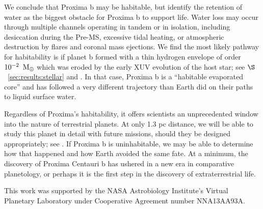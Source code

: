\documentclass[preprint,12pt]{aastex}
\newcommand{\xxx}[1]{{\color{red} #1}} %
\newcommand{\xxx}[1]{{\color{red} #1}} %
\def\mearth{{\rm\,M_\oplus}}
\begin{document}
We conclude that Proxima b may be habitable, but identify the
retention of water as the biggest obstacle for Proxima b to support
life. Water loss may occur through multiple channels operating in
tandem or in isolation, including desiccation during the Pre-MS,
excessive tidal heating, or atmospheric destruction by flares and
coronal mass ejections. We find the most likely pathway for
habitability is if planet b formed with a thin hydrogen envelope of
order $10^{-2}~\mearth$ which was eroded by the early XUV evolution of
the host star; see $\S$~\ref{sec:results:stellar} and \cite{Luger15}. In
that case, Proxima b is a ``habitable evaporated core'' and has
followed a very different trajectory than Earth did on their paths to
liquid surface water.

Regardless of Proxima's habitability, it offers scientists an
\xxx{unprecedented} window into the nature of terrestrial planets. At only
1.3 pc distance, we will be able to study this planet in detail with
future missions, should they be designed appropriately; see
\cite{Meadows16}. If Proxima b is uninhabitable, we may be able to
determine how that happened and how Earth avoided the same fate. At a
minimum, the discovery of Proxima Centauri b has ushered in a new era
in comparative planetology, or perhaps it is the first step in the
discovery of extraterrestrial life.
 
\vspace{1cm}
This work was supported by the NASA Astrobiology Institute's Virtual
Planetary Laboratory under Cooperative Agreement number NNA13AA93A.



\end{document}
